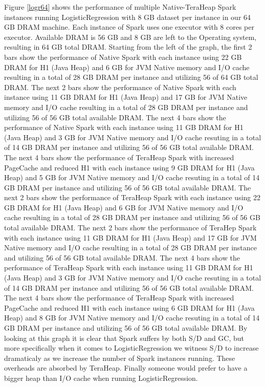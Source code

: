 Figure \ref{logr64} shows the performance of multiple Native-TeraHeap
Spark instances running LogisticRegression with 8 GB dataset per
instance in our 64 GB DRAM machine. Each instance of Spark uses one
executor with 8 cores per executor. Available DRAM is 56 GB and 8 GB
are left to the Operating system, resulting in 64 GB total DRAM.
Starting from the left of the graph, the first 2 bars show the
performance of Native Spark with each instance using 22 GB DRAM for H1
(Java Heap) and 6 GB for JVM Native memory and I/O cache resulting in
a total of 28 GB DRAM per instance and utilizing 56 of 64 GB total
DRAM. The next 2 bars show the performance of Native Spark with each
instance using 11 GB DRAM for H1 (Java Heap) and 17 GB for JVM Native
memory and I/O cache resulting in a total of 28 GB DRAM per instance
and utilizing 56 of 56 GB total available DRAM. The next 4 bars show
the performance of Native Spark with each instance using 11 GB DRAM
for H1 (Java Heap) and 3 GB for JVM Native memory and I/O cache
resuting in a total of 14 GB DRAM per instance and utilizing 56 of 56
GB total available DRAM. The next 4 bars show the performance of
TeraHeap Spark with increased PageCache and reduced H1 with each
instance using 9 GB DRAM for H1 (Java Heap) and 5 GB for JVM Native
memory and I/O cache resuting in a total of 14 GB DRAM per instance
and utilizing 56 of 56 GB total available DRAM. The next 2 bars show
the performance of TeraHeap Spark with each instance using 22 GB DRAM
for H1 (Java Heap) and 6 GB for JVM Native memory and I/O cache
resulting in a total of 28 GB DRAM per instance and utilizing 56 of 56
GB total available DRAM. The next 2 bars show the performance of
TeraHep Spark with each instance using 11 GB DRAM for H1 (Java Heap)
and 17 GB for JVM Native memory and I/O cache resulting in a total of
28 GB DRAM per instance and utilizing 56 of 56 GB total available
DRAM. The next 4 bars show the performance of TeraHeap Spark with each
instance using 11 GB DRAM for H1 (Java Heap) and 3 GB for JVM Native
memory and I/O cache resuting in a total of 14 GB DRAM per instance
and utilizing 56 of 56 GB total available DRAM. The next 4 bars show
the performance of TeraHeap Spark with increased PageCache and reduced
H1 with each instance using 6 GB DRAM for H1 (Java Heap) and 8 GB for
JVM Native memory and I/O cache resuting in a total of 14 GB DRAM per
instance and utilizing 56 of 56 GB total available DRAM.  By looking
at this graph it is clear that Spark suffers by both S/D and GC, but
more specifically when it comes to LogisticRegression we witness S/D
to increase dramaticaly as we increase the number of Spark instances
running. These overheads are absorbed by TeraHeap. Finally someone
would prefer to have a bigger heap than I/O cache when running
LogisticRegression.

